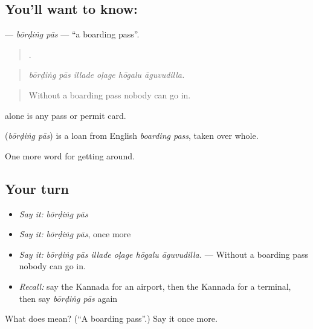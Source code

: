 \subsection*{You'll want to know:  }
\textbf{ } — \emph{bōrḍiṅg pās} — \textquotedblleft{}a boarding pass\textquotedblright{}.

\begin{quote}
     .
\end{quote}

\begin{quote}
\emph{bōrḍiṅg pās illade oḷage hōgalu āguvudilla.}
\end{quote}

\begin{quote}
Without a boarding pass nobody can go in.
\end{quote}

 alone is any pass or permit card.

\begin{cousinweb}
\textbf{ } (\emph{bōrḍiṅg pās}) is a loan from English \emph{boarding pass}, taken over whole.
\end{cousinweb}

\begin{grammarlens}[title={What you've built}]
One more word for getting around.
\end{grammarlens}

\subsection*{Your turn}
\begin{itemize}
\raggedright
  \item \emph{Say it:} \emph{bōrḍiṅg pās}
  \item \emph{Say it:} \emph{bōrḍiṅg pās}, once more
  \item \emph{Say it:} \emph{bōrḍiṅg pās illade oḷage hōgalu āguvudilla.} — Without a boarding pass nobody can go in.
  \item \emph{Recall:} say the Kannada for an airport, then the Kannada for a terminal, then say \emph{bōrḍiṅg pās} again
\end{itemize}

\begin{tcolorbox}[breakable,colback=teal!4,colframe=teal!35!black,title={Before you move on}]
What does   mean? (\textquotedblleft{}A boarding pass\textquotedblright{}.) Say it once more.
\end{tcolorbox}
